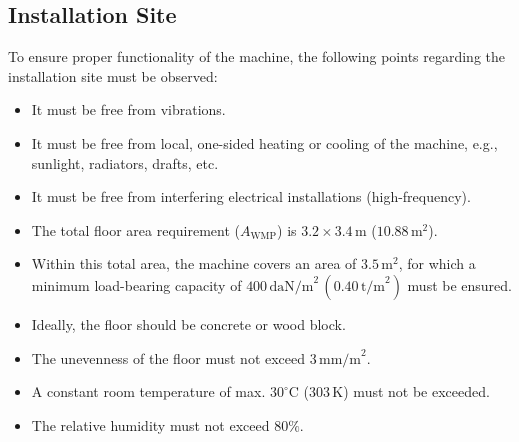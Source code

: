 \vspace{1em}



\subsection{Installation Site}
To ensure proper functionality of the machine, the following points regarding the installation site must be observed:
\begin{itemize}
    \item It must be free from vibrations.
    \item It must be free from local, one-sided heating or cooling of the machine, e.g., sunlight, radiators, drafts, etc.
    \item It must be free from interfering electrical installations (high-frequency).
    \item The total floor area requirement ($A_\text{WMP}$) is $3.2 \times 3.4 \, \text{m}$ ($10.88 \, \text{m}^2$).
    \item Within this total area, the machine covers an area of $3.5 \, \text{m}^2$, for which a minimum load-bearing capacity of $400 \, \text{daN/m}^2 \, (0.40 \, \text{t/m}^2)$ must be ensured.
    \item Ideally, the floor should be concrete or wood block.
\end{itemize}


\begin{itemize}
    \item The unevenness of the floor must not exceed $3 \, \text{mm/m}^2$.
    \item A constant room temperature of max. $30^\circ \text{C}$ ($303 \, \text{K}$) must not be exceeded.
    \item The relative humidity must not exceed $80\%$.
\end{itemize}


\\

